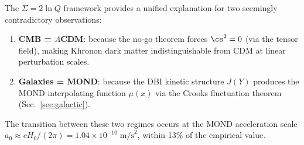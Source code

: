 The $\Sigma = 2\ln Q$ framework provides a unified explanation for
two seemingly contradictory observations:
\begin{enumerate}
\item \textbf{CMB = $\Lambda$CDM}: because the no-go theorem forces
  $\cs^2 = 0$ (via the tensor field), making Khronon dark matter
  indistinguishable from CDM at linear perturbation scales.
\item \textbf{Galaxies = MOND}: because the DBI kinetic structure
  $J(Y)$ produces the MOND interpolating function $\mu(x)$ via the
  Crooks fluctuation theorem (Sec.~\ref{sec:galactic}).
\end{enumerate}

The transition between these two regimes occurs at the MOND
acceleration scale $a_0 \approx cH_0/(2\pi) = 1.04 \times 10^{-10}\;\mathrm{m/s}^2$,
within 13\% of the empirical value.
